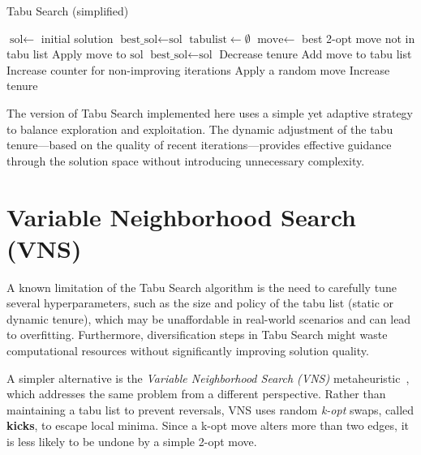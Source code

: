 \begin{algorithm}
\caption{Tabu Search (simplified)}
\begin{algorithmic}
    \State $\text{sol} \gets$ initial solution
    \State $\text{best\_sol} \gets \text{sol}$
    \State $\text{tabulist} \gets \emptyset$
        \State $\text{move} \gets$ best 2-opt move not in tabu list
        \State Apply $\text{move}$ to $\text{sol}$
            \State $\text{best\_sol} \gets \text{sol}$
                \State Decrease tenure
            \EndIf
        \Else
            \State Add $\text{move}$ to tabu list
            \State Increase counter for non-improving iterations
        \EndIf
            \State Apply a random move
                \State Increase tenure
            \EndIf
        \EndIf
    \EndWhile
\end{algorithmic}
\end{algorithm}

The version of Tabu Search implemented here uses a simple yet adaptive strategy to balance exploration and exploitation. 
The dynamic adjustment of the tabu tenure—based on the quality of recent iterations—provides effective guidance through the solution space 
without introducing unnecessary complexity.

\clearpage

\section{Variable Neighborhood Search (VNS)}

A known limitation of the Tabu Search algorithm is the need to carefully tune several hyperparameters, such as the size and policy 
of the tabu list (static or dynamic tenure), which may be unaffordable in real-world scenarios and can lead to overfitting. 
Furthermore, diversification steps in Tabu Search might waste computational resources without significantly improving solution quality.

A simpler alternative is the \textit{Variable Neighborhood Search (VNS)} metaheuristic~\cite{Hansen2009}, 
which addresses the same problem from a different perspective. Rather than maintaining a tabu list to prevent reversals, 
VNS uses random \textit{k-opt} swaps, called \textbf{kicks}, to escape local minima. Since a k-opt move alters more than two edges, 
it is less likely to be undone by a simple 2-opt move.

